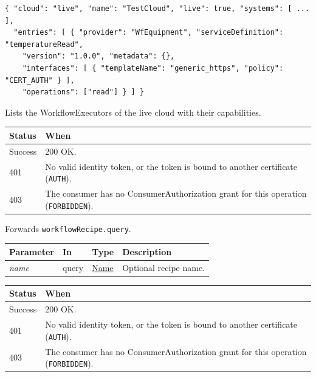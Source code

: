 \documentclass[a4paper]{arrowhead}
\newcommand{\fparam}[1]{\textit{\textcolor{ArrowheadBlue}{#1}}}
\newcommand{\pref}[1]{{\textcolor{ArrowheadGrey}{\hyperref[sec:model:primitives:#1]{#1}}}}
\begin{document}
\begin{lstlisting}[caption={Example response body}]
{ "cloud": "live", "name": "TestCloud", "live": true, "systems": [ ... ],
  "entries": [ { "provider": "WfEquipment", "serviceDefinition": "temperatureRead",
    "version": "1.0.0", "metadata": {},
    "interfaces": [ { "templateName": "generic_https", "policy": "CERT_AUTH" } ],
    "operations": ["read"] } ] }
\end{lstlisting}

Lists the WorkflowExecutors of the live cloud with their capabilities.

{\small
\begin{longtable}{|p{2.0cm}|p{13.8cm}|}

\hline
\rowcolor{gray!33} Status & When \\ \hline
\endhead
Success & 200 OK. \\ \hline
401 & No valid identity token, or the token is bound to another certificate (\texttt{AUTH}). \\ \hline
403 & The consumer has no ConsumerAuthorization grant for this operation (\texttt{FORBIDDEN}). \\ \hline
\end{longtable}
}

Forwards \texttt{workflowRecipe.query}.

{\small
\begin{longtable}{|p{3.0cm}|p{1.4cm}|p{3.2cm}|p{8.2cm}|}

\hline
\rowcolor{gray!33} Parameter & In & Type & Description \\ \hline
\endhead
\fparam{name} & query & \pref{Name} & Optional recipe name. \\ \hline
\end{longtable}
}


{\small
\begin{longtable}{|p{2.0cm}|p{13.8cm}|}

\hline
\rowcolor{gray!33} Status & When \\ \hline
\endhead
Success & 200 OK. \\ \hline
401 & No valid identity token, or the token is bound to another certificate (\texttt{AUTH}). \\ \hline
403 & The consumer has no ConsumerAuthorization grant for this operation (\texttt{FORBIDDEN}). \\ \hline
\end{longtable}
}
\end{document}
